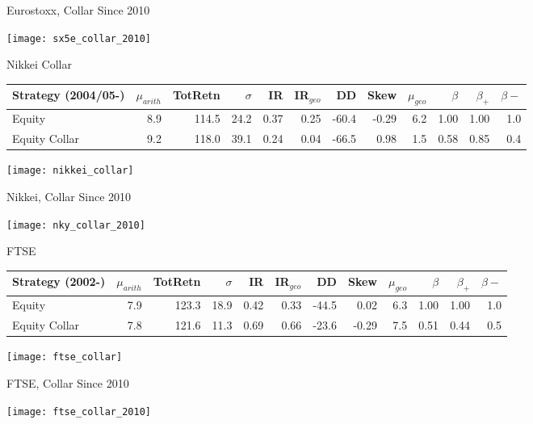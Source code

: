 \documentclass{beamer}
\begin{document}
\begin{frame}{Eurostoxx, Collar Since 2010}

\texttt{[image: sx5e\_collar\_2010]}
\end{frame}




\begin{frame}{Nikkei Collar}

\scalebox{0.65} {

\begin{tabular}{lrrrrrrrrrrr}
\toprule
Strategy (2004/05-) & $\mu_{arith}$ & TotRetn & $\sigma$ & IR & IR$_{geo}$ & DD & Skew & $\mu_{geo}$ & $\beta$ & $\beta_+$ & $\beta-$ \\
\midrule
Equity & 8.9 & 114.5 & 24.2 & 0.37 & 0.25 & -60.4 & -0.29 & 6.2 & 1.00 & 1.00 & 1.0\\
Equity Collar & 9.2 & 118.0 & 39.1 & 0.24 & 0.04 & -66.5 & 0.98 & 1.5 & 0.58 & 0.85 & 0.4\\
\bottomrule
\end{tabular}
}

\texttt{[image: nikkei\_collar]}
\end{frame}


\begin{frame}{Nikkei, Collar Since 2010}

\texttt{[image: nky\_collar\_2010]}
\end{frame}

\begin{frame}{FTSE}

\scalebox{0.65} {

\begin{tabular}{lrrrrrrrrrrr}
\toprule
Strategy (2002-) & $\mu_{arith}$ & TotRetn & $\sigma$ & IR & IR$_{geo}$ & DD & Skew & $\mu_{geo}$ & $\beta$ & $\beta_+$ & $\beta-$ \\
\midrule
Equity & 7.9 & 123.3 & 18.9 & 0.42 & 0.33 & -44.5 & 0.02 & 6.3 & 1.00 & 1.00 & 1.0\\
Equity Collar & 7.8 & 121.6 & 11.3 & 0.69 & 0.66 & -23.6 & -0.29 & 7.5 & 0.51 & 0.44 & 0.5\\
\bottomrule
\end{tabular}

}

\texttt{[image: ftse\_collar]}
\end{frame}


\begin{frame}{FTSE, Collar Since 2010}

\texttt{[image: ftse\_collar\_2010]}
\end{frame}
\end{document}
